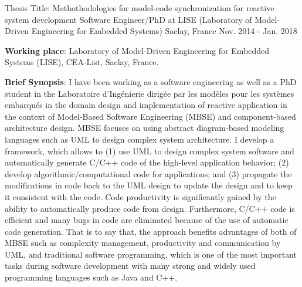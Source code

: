 


\begin{cventries}


\cventry
{Thesis Title: Methothodologies for model-code synchronization for reactive system development} %
{Software Engineer/PhD at LISE (Laboratory of Model-Driven Engineering for Embedded Systems)} %
{Saclay, France} %
{Nov. 2014 - Jan. 2018} %
{ %
	\begin{cvitems}
		\item {\textbf{Working place}: Laboratory of Model-Driven Engineering for Embedded Systems (LISE), CEA-List, Saclay, France.}	
		\item {\textbf{Brief Synopsis}: I have been working as a software engineering as well as a PhD student in the Laboratoire d'Ingénierie dirigée par les modèles pour les systèmes embarqués in the domain design and implementation of reactive application in the context of Model-Based Software Engineering (MBSE) and component-based architecture design. 
		MBSE focuses on using abstract diagram-based modeling languages such as UML to design complex system architecture. 
		I develop a framework, which allows to (1) use UML to design complex system software and automatically generate C/C++ code of the high-level application behavior; (2) develop algorithmic/computational code for applications; and (3) propagate the modifications in code back to the UML design to update the design and to keep it consistent with the code. 
		Code productivity is significantly gained by the ability to automatically produce code from design. Furthermore, C/C++ code is efficient and many bugs in code are eliminated because of the use of automatic code generation. That is to say that, the approach benefits advantages of both of MBSE such as complexity management, productivity  and communication by UML, and traditional software programming, which is one of the most important tasks during software development with many strong and widely used programming languages such as Java and C++.  
}
\end{cvitems}}
\end{cventries}
